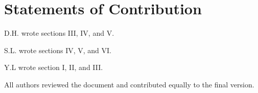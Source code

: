 \documentclass[aps,prl,twocolumn, superscriptaddress,nobalancelastpage]{revtex4}
\begin{document}











\section{Statements of Contribution}
\noindent D.H. wrote sections III, IV, and V.

\noindent S.L. wrote sections IV, V, and VI.

\noindent Y.L wrote section I, II, and III.

\noindent All authors reviewed the document and contributed equally to the final version.
\vspace{-1em}
\end{document}
